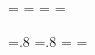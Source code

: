     \newpage

    \newlength{\mtL}
\setlength{\mtL}{.8\paperheight}%
\addtolength\mtL{-\headwidth}
\newpage
\addtolength\headwidth{\mtL}
\pdfpageheight=\paperwidth
\pdfpagewidth=\paperheight
\paperwidth=\pdfpagewidth
\paperheight=\pdfpageheight

\begingroup
\vsize=.8\pdfpageheight %
\hsize=.8\pdfpagewidth  %
\textwidth=\hsize
\textheight=\vsize

